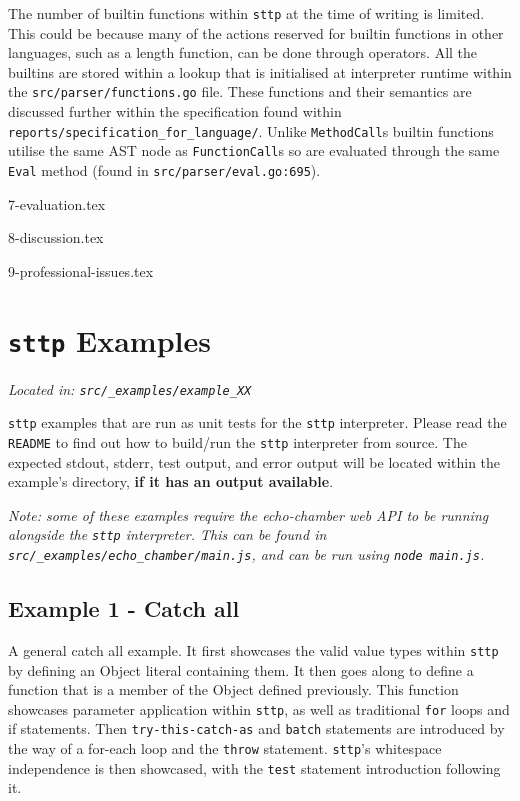 \documentclass[]{full}
\theoremstyle{definition}
\begin{document}
The number of builtin functions within \verb|sttp| at the time of writing is limited. This could be because many of the actions reserved for builtin functions in other languages, such as a length function, can be done through operators. All the builtins are stored within a lookup that is initialised at interpreter runtime within the \verb|src/parser/functions.go| file. These functions and their semantics are discussed further within the specification found within \verb|reports/specification_for_language/|. Unlike \verb|MethodCall|s builtin functions utilise the same AST node as \verb|FunctionCall|s so are evaluated through the same \verb|Eval| method (found in \verb|src/parser/eval.go:695|).

{7-evaluation.tex}

{8-discussion.tex}

{9-professional-issues.tex}

\appendix

\cprotect\chapter{\verb|sttp| Examples}
\label{appendix:sttp-examples}

\cprotect\textit{Located in: \verb|src/_examples/example_XX|}

\verb|sttp| examples that are run as unit tests for the \verb|sttp| interpreter. Please read the \verb|README| to find out how to build/run the \verb|sttp| interpreter from source. The expected stdout, stderr, test output, and error output will be located within the example's directory, \textbf{if it has an output available}.

\cprotect\textit{Note: some of these examples require the echo-chamber web API to be running alongside the \verb|sttp| interpreter. This can be found in \verb|src/_examples/echo_chamber/main.js|, and can be run using \verb|node main.js|.}

\section{Example 1 - Catch all}
\label{appendix:sttp-examples-1}

A general catch all example. It first showcases the valid value types within \verb|sttp| by defining an Object literal containing them. It then goes along to define a function that is a member of the Object defined previously. This function showcases parameter application within \verb|sttp|, as well as traditional \verb|for| loops and if statements. Then \verb|try-this-catch-as| and \verb|batch| statements are introduced by the way of a for-each loop and the \verb|throw| statement. \verb|sttp|'s whitespace independence is then showcased, with the \verb|test| statement introduction following it.
\end{document}
